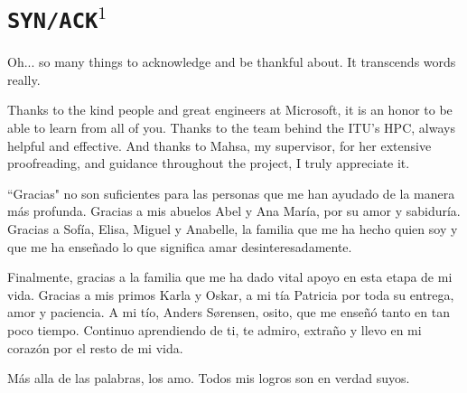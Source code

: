 \documentclass{thesis/resources/ituthesis}
\begin{document}
\frontmatter

\thetitlepage
\newpage
\chapter{\texttt{SYN/ACK}$^1$}

\parbox{0.8\textwidth}{
Oh... so many things to acknowledge and be thankful about. It transcends words really.

Thanks to the kind people and great engineers at Microsoft, it is an honor to be able to learn
from all of you. Thanks to the team behind the ITU's HPC, always helpful and effective. 
And thanks to Mahsa, my supervisor, for her extensive proofreading, and guidance throughout 
the project, I truly appreciate it. 
}

\vspace{3.5cm}

\parbox{\textwidth}{
    \begin{flushright}
``Gracias" no son suficientes para las personas que me han ayudado de la manera 
m\'as profunda. Gracias a mis abuelos Abel y Ana Mar\'ia, por su amor y sabidur\'ia.
Gracias a Sof\'ia, Elisa, Miguel y Anabelle, la familia que me ha hecho quien soy y 
que me ha ense\~nado lo que significa amar desinteresadamente. 

Finalmente, gracias a la familia que me ha dado vital apoyo en esta etapa de mi vida. Gracias a 
mis primos Karla y Oskar, a mi t\'ia Patricia por toda su entrega, amor y paciencia. A mi t\'io, Anders S\o{}rensen, 
osito, que me ense\~n\'o tanto en tan poco tiempo. Continuo aprendiendo de ti, te admiro, extra\~no 
y llevo en mi coraz\'on por el resto de mi vida.  

M\'as alla de las palabras, los amo. Todos mis logros son en verdad suyos.
    \end{flushright}
}
\end{document}
